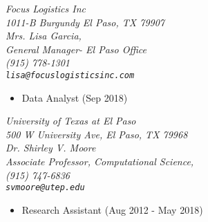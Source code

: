 \documentclass[margin]{res}
\begin{document}
\begin{resume}
{\sl Focus Logistics Inc\\
1011-B Burgundy El Paso, TX 79907\\
Mrs. Lisa Garcia,\\
General Manager- El Paso Office\\
(915) 778-1301\\
\verb+lisa@focuslogisticsinc.com+
} \hfill  
\begin{itemize}
\item Data Analyst (Sep 2018)
\end{itemize}


% 


{\sl University of Texas at El Paso\\
500 W University Ave, El Paso, TX  79968\\
Dr. Shirley V. Moore\\
Associate Professor, Computational Science,\\
(915) 747-6836\\%
\verb+svmoore@utep.edu+
} \hfill  
\begin{itemize}
\item Research Assistant (Aug 2012 - May 2018)
\end{itemize}

%   

\end{resume}
\end{document}
